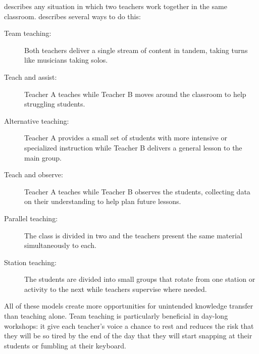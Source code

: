
 describes any situation
in which two teachers work together in the same classroom.
\cite{Frie2016} describes several ways to do this:

\begin{description}

\item[Team teaching:]
  Both teachers deliver a single stream of content in tandem,
  taking turns like musicians taking solos.

\item[Teach and assist:]
  Teacher A teaches while Teacher B moves around the classroom
  to help struggling students.

\item[Alternative teaching:]
  Teacher A provides a small set of students with more intensive or specialized instruction
  while Teacher B delivers a general lesson to the main group.

\item[Teach and observe:]
  Teacher A teaches while Teacher B observes the students,
  collecting data on their understanding to help plan future lessons.

\item[Parallel teaching:]
  The class is divided in two
  and the teachers present the same material simultaneously to each.

\item[Station teaching:]
  The students are divided into small groups
  that rotate from one station or activity to the next
  while teachers supervise where needed.

\end{description}

All of these models create more opportunities for unintended knowledge transfer than teaching alone.
Team teaching is particularly beneficial in day-long workshops:
it give each teacher's voice a chance to rest
and reduces the risk that they will be so tired by the end of the day
that they will start snapping at their students
or fumbling at their keyboard.

